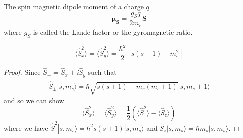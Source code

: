 \documentclass[a4paper]{article}
\begin{document}
\begin{defi}
The spin magnetic dipole moment of a charge $q$
$$\boldsymbol{\mu_S}=\frac{g_Sq}{2m_e}\mathbf{S}$$
where $g_S$ is called the Lande factor or the gyromagnetic ratio.
\end{defi}
\begin{thm}
$$\langle\hat{S}_x^2\rangle=\langle\hat{S}_y^2\rangle=\frac{\hbar^2}{2}[s(s+1)-m_s^2]$$
\end{thm}
\begin{proof}
Since $\hat{S}_{\pm}=\hat{S}_x\pm i\hat{S}_y$ such that
$$\hat{S}_\pm|s,m_s\rangle=\hbar\sqrt{s(s+1)-m_s(m_s\pm1)}|s,m_s\pm 1\rangle$$
and so we can show
$$\langle\hat{S}_x^2\rangle=\langle\hat{S}_y^2\rangle=\frac{1}{2}(\langle\hat{S}^2\rangle-\langle\hat{S}_z\rangle)$$
where we have $\hat{S}^2|s,m_s\rangle=\hbar^2s(s+1)|s,m_s\rangle$ and $\hat{S}_z|s,m_s\rangle=\hbar m_s|s,m_s\rangle$.
\end{proof}
\end{document}
